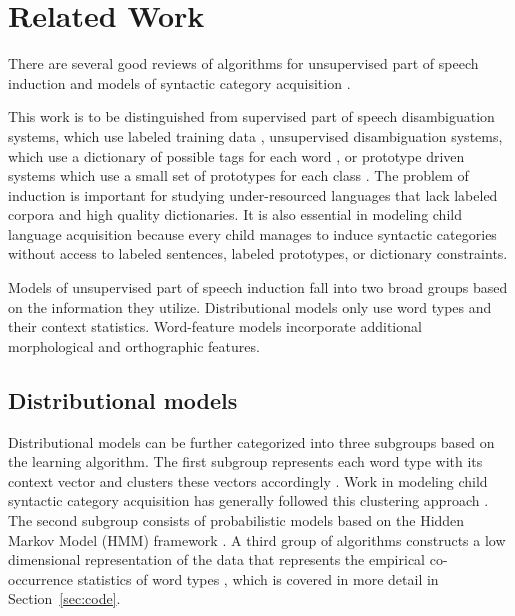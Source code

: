 \section{Related Work}
\label{sec:related}
There are several good reviews of algorithms for unsupervised
part of speech induction
\cite{Christodoulopoulos:2010:TDU:1870658.1870714,Gao:2008:CBE:1613715.1613761}
and models of syntactic category acquisition \cite{ambridge2011child}.

This work is to be distinguished from supervised part of speech
disambiguation systems, which use labeled training data
\cite{Toutanova:2003:FPT:1073445.1073478}, unsupervised disambiguation
systems, which use a dictionary of possible tags for each word
\cite{yatbaz-yuret:2010:POSTERS}, or prototype driven systems
which use a small set of prototypes for each class
\cite{Haghighi:2006:PLS:1220835.1220876}.  The problem of induction is
important for studying under-resourced languages that lack labeled
corpora and high quality dictionaries.  It is also essential in
modeling child language acquisition because every child manages to
induce syntactic categories without access to labeled sentences,
labeled prototypes, or dictionary constraints.

Models of unsupervised part of speech induction fall into two broad
groups based on the information they utilize.  Distributional models
only use word types and their context statistics.  Word-feature models
incorporate additional morphological and orthographic features.

\subsection{Distributional models}

Distributional models can be further categorized into three subgroups
based on the learning algorithm.  The first subgroup represents each
word type with its context vector and clusters these vectors
accordingly \cite{Schutze:1995:DPT:976973.976994}.  Work in modeling
child syntactic category acquisition has generally followed this
clustering approach
\cite{redington1998distributional,mintz2003frequent}.  The second
subgroup consists of probabilistic models based on the Hidden Markov
Model (HMM) framework \cite{Brown:1992:CNG:176313.176316}.  A third
group of algorithms constructs a low dimensional representation of the
data that represents the empirical co-occurrence statistics of word
types \cite{globerson2007euclidean}, which is covered in more detail
in Section~\ref{sec:code}.

